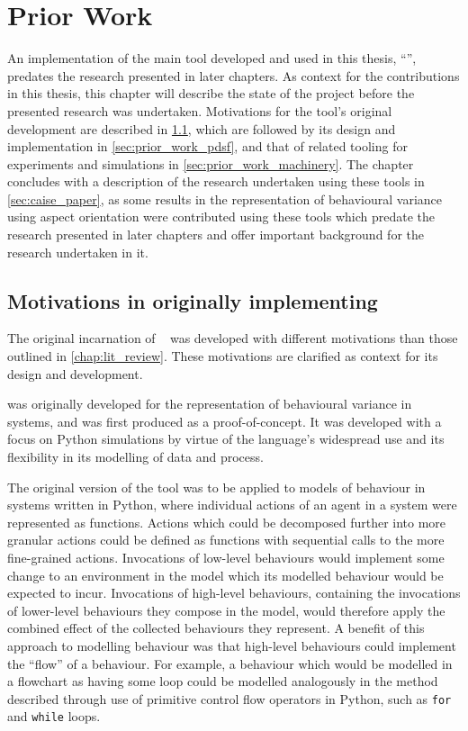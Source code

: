 \chapter{Prior Work}\label{chap:prior_work}


An implementation of the main tool developed and used in this thesis,
``\pdsf{}'', predates the research presented in later chapters. As context for
the contributions in this thesis, this chapter will describe the state of the
project before the presented research was undertaken. Motivations for the tool's
original development are described in \cref{sec:pdsf_motivations}, which are
followed by its design and implementation in \cref{sec:prior_work_pdsf}, and
that of related tooling for experiments and simulations in
\cref{sec:prior_work_machinery}. The chapter concludes with a description of the
research undertaken using these tools in \cref{sec:caise_paper}, as some results
in the representation of behavioural variance using aspect orientation were
contributed using these tools which predate the research presented in later
chapters and offer important background for the research undertaken in it.

\section{Motivations in originally implementing \pdsf{}}\label{sec:pdsf_motivations}

The original incarnation of \pdsf{}~\cite{wallis2018caise} was developed with
different motivations than those outlined in \cref{chap:lit_review}. These
motivations are clarified as context for its design and
development.

\pdsf{} was originally developed for the representation of behavioural variance
in \sociotechnical systems, and was first produced as a proof-of-concept. It was
developed with a focus on Python simulations by virtue of the language's widespread
use and its flexibility in its modelling of data and process.

The original version of the tool was to be applied to models of behaviour in
\sociotechnical systems written in Python, where individual actions of an agent
in a system were represented as functions. Actions which could be decomposed
further into more granular actions could be defined as functions with sequential
calls to the more fine-grained actions. Invocations of low-level
behaviours would implement some change to an environment in the model which its
modelled behaviour would be expected to incur. Invocations of high-level
behaviours, containing the invocations of lower-level behaviours they compose in
the model, would therefore apply the combined effect of the collected behaviours
they represent. A benefit of this approach to modelling behaviour was that
high-level behaviours could implement the ``flow'' of a behaviour. For example,
a behaviour which would be modelled in a flowchart as having some loop could be
modelled analogously in the method described through use of primitive control
flow operators in Python, such as \lstinline{for} and \lstinline{while} loops.

